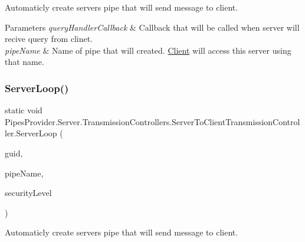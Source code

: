 Automaticly create server\textquotesingle{}s pipe that will send message to client. 


\begin{DoxyParams}{Parameters}
{\em query\+Handler\+Callback} & Callback that will be called when server will recive query from clinet.\\
\hline
{\em pipe\+Name} & Name of pipe that will created. \mbox{\hyperlink{namespace_pipes_provider_1_1_client}{Client}} will access this server using that name.\\
\hline
\end{DoxyParams}
\mbox{\label{class_pipes_provider_1_1_server_1_1_transmission_controllers_1_1_server_to_client_transmission_controller_a0b40f93950cbf37335373f6efec0a4f1}} 
\subsubsection{\texorpdfstring{Server\+Loop()}{ServerLoop()}\hspace{0.1cm}{\footnotesize\ttfamily [2/2]}}
{\footnotesize\ttfamily static void Pipes\+Provider.\+Server.\+Transmission\+Controllers.\+Server\+To\+Client\+Transmission\+Controller.\+Server\+Loop (\begin{DoxyParamCaption}\item[{string}]{guid,  }\item[{string}]{pipe\+Name,  }\item[{\mbox{\hyperlink{namespace_pipes_provider_1_1_security_a1a6020eca1c661a6f7140e8260502d7e}{Security.\+Security\+Level}}}]{security\+Level }\end{DoxyParamCaption})\hspace{0.3cm}{\ttfamily [static]}}



Automaticly create server\textquotesingle{}s pipe that will send message to client. 


